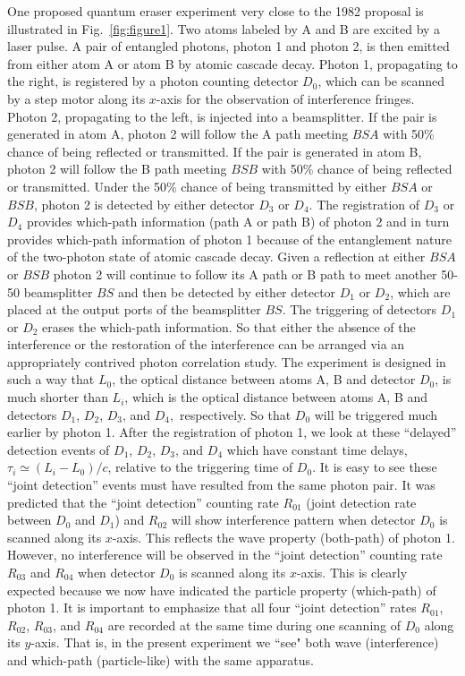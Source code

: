 \documentclass[pra,aps,epsf,12pt]{revtex4-2}
\begin{document}
One proposed quantum eraser experiment very close to the 1982 proposal is illustrated in
Fig.~\ref{fig:figure1}. Two atoms labeled by A and B are excited by a laser pulse. A pair
of entangled photons, photon 1 and photon 2, is then emitted from either atom A or atom B
by atomic cascade decay. Photon 1, propagating to the right, is registered by a photon
counting detector $D_{0}$, which can be scanned by a step motor along its $x$-axis for
the observation of interference fringes. Photon 2, propagating to the left, is injected
into a beamsplitter. If the pair is generated in atom A, photon 2 will follow the A path
meeting $BSA$ with 50\% chance of being reflected or transmitted. If the pair is
generated in atom B, photon 2 will follow the B path meeting $BSB$ with 50\% chance of
being reflected or transmitted. Under the 50\% chance of being transmitted by either
$BSA$ or $BSB$, photon 2 is detected by either detector $D_{3}$ or $D_{4}$. The
registration of $D_{3}$ or $D_{4}$ provides which-path information (path A or path B) of
photon 2 and in turn provides which-path information of photon 1 because of the
entanglement nature of the two-photon state of atomic cascade decay. Given a reflection
at either $BSA$ or $BSB$ photon 2 will continue to follow its A path or B path to meet
another 50-50 beamsplitter $BS$ and then be detected by either detector $D_{1}$ or
$D_{2}$, which are placed at the output ports of the beamsplitter $BS$. The triggering of
detectors $D_{1}$ or $D_{2}$ erases the which-path information. So that either the
absence of the interference or the restoration of the interference can be arranged via an
appropriately contrived photon correlation study. The experiment is designed in such a
way that $L_{0}$, the optical distance between atoms A, B and detector $D_{0}$, is much
shorter than $L_{i}$, which is the optical distance between atoms A, B and detectors
$D_{1}$, $D_{2}$, $D_{3}$, and $D_{4},$ respectively. So that $D_{0}$ will be triggered
much earlier by photon 1. After the registration of photon 1, we look at these
``delayed'' detection events of $D_{1}$, $D_{2}$, $D_{3}$, and $D_{4}$ which have
constant time delays, $\tau _{i}\simeq (L_{i}-L_{0})/c$, relative to the triggering time
of $D_{0}$. It is easy to see these ``joint detection'' events must have resulted from
the same photon pair. It was predicted that the ``joint detection'' counting rate
$R_{01}$ (joint detection rate between $D_{0}$ and $D_{1}$) and $R_{02}$ will show
interference pattern when detector $D_{0}$ is scanned along its $x$-axis. This reflects
the wave property (both-path) of photon 1. However, no interference will be observed in
the ``joint detection'' counting rate $R_{03}$ and $R_{04}$ when detector $D_{0}$ is
scanned along its $x$-axis. This is clearly expected because we now have indicated the
particle property (which-path) of photon 1. It is important to emphasize
that all four ``joint detection'' rates $R_{01}$, $R_{02}$, $R_{03}$, and $%
R_{04}$ are recorded at the same time during one scanning of $D_{0}$ along its $y$-axis.
That is, in the present experiment we ``see" both wave (interference) and which-path
(particle-like) with the same apparatus.
\end{document}
